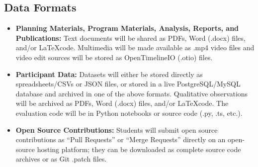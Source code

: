 \subsection{Data Formats}
\begin{itemize}
    \item \textbf{Planning Materials, Program Materials, Analysis, Reports, and Publications:} Text documents will be shared as PDFs, Word (.docx) files, and/or \LaTeX code. Multimedia will be made available as .mp4 video files and video edit sources will be stored as OpenTimelineIO (.otio) files.
    
    \item \textbf{Participant Data:} Datasets will either be stored directly as spreadsheets/CSVs or JSON files, or stored in a live PostgreSQL/MySQL database and archived in one of the above formats. Qualitative observations will be archived as PDFs, Word (.docx) files, and/or \LaTeX code. The evaluation code will be in Python notebooks or source code (.py, .ts, etc.).
    
    \item \textbf{Open Source Contributions:} Students will submit open source contributions as ``Pull Requests'' or ``Merge Requests'' directly on an open-source hosting platform; they can be downloaded as complete source code archives or as Git .patch files.
\end{itemize}


